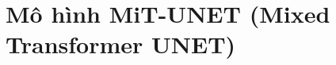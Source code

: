 \documentclass[../DoAn.tex]{subfiles}
\begin{document}
\section{Mô hình MiT-UNET (Mixed Transformer UNET)}




\end{document}

